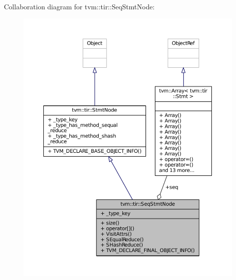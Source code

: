 Collaboration diagram for tvm\+:\+:tir\+:\+:Seq\+Stmt\+Node\+:
\nopagebreak
\begin{figure}[H]
\begin{center}
\leavevmode
\includegraphics[width=350pt]{classtvm_1_1tir_1_1SeqStmtNode__coll__graph}
\end{center}
\end{figure}
